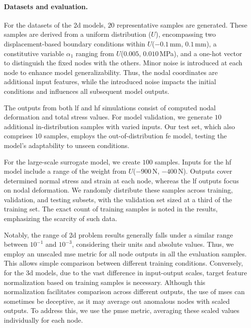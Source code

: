 \documentclass[12pt,a4paper]{report}
\begin{document}
\paragraph{Datasets and evaluation.} For the datasets of the \ac{2d} models, $20$ representative samples are generated. These samples are derived from a uniform distribution ($U$), encompassing two displacement-based boundary conditions within $U$($-0.1$\,mm, $0.1$\,mm), a constitutive variable $\alpha_1$ ranging from $U$($0.005$, $0.010$\,MPa), and a one-hot vector to distinguish the fixed nodes with the others. Minor noise is introduced at each node to enhance model generalizability. Thus, the nodal coordinates are additional input features, while the introduced noise impacts the initial conditions and influences all subsequent model outputs.

The outputs from both \ac{lf} and \ac{hf} simulations consist of computed nodal deformation and total stress values. For model validation, we generate $10$ additional in-distribution samples with varied inputs. Our test set, which also comprises $10$ samples, employs the out-of-distribution \ac{fe} model, testing the model's adaptability to unseen conditions.

For the large-scale surrogate model, we create $100$ samples. Inputs for the \ac{hf} model include a range of the weight from $U$($-900$\,N, $-400$\,N). Outputs cover determined normal stress and strain at each node, whereas the \ac{lf} outputs focus on nodal deformation. We randomly distribute these samples across training, validation, and testing subsets, with the validation set sized at a third of the training set. The exact count of training samples is noted in the results, emphasizing the scarcity of such data.

Notably, the range of \ac{2d} problem results generally falls under a similar range between $10^{-1}$ and $10^{-3}$, considering their units and absolute values. Thus, we employ an unscaled \ac{mse} metric for all node outputs in all the evaluation samples. This allows simple comparison between different training conditions. Conversely, for the \ac{3d} models, due to the vast difference in input-output scales, target feature normalization based on training samples is necessary. Although this normalization facilitates comparison across different outputs, the use of \acp{mse} can sometimes be deceptive, as it may average out anomalous nodes with scaled outputs. To address this, we use the \ac{pmse} metric, averaging these scaled values individually for each node.
\end{document}
